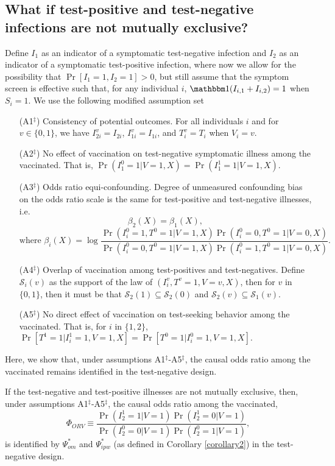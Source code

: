 \begin{appendix}
\subsection{What if test-positive and test-negative infections are not mutually exclusive?}
Define $I_1$ as an indicator of a symptomatic test-negative infection and $I_2$ as an indicator of a symptomatic test-positive infection, where now we allow for the possibility that $\Pr[I_1 = 1, I_2 = 1] > 0$, but still assume that the symptom screen is effective such that, for any individual $i$, $\mathbbm 1(I_{i,1} + I_{i,2}) = 1$ when $S_i = 1$. We use the following modified assumption set 
\begin{itemize}
    \item[(A1$^\ddagger$)] Consistency of potential outcomes. For all individuals $i$ and for $v \in \{0, 1\}$, we have $I_{2i}^v = I_{2i}$, $I_{1i}^v = I_{1i}$, and $T_i^v = T_i$ when $V_i = v$.
    \item[(A2$^\ddagger$)] No effect of vaccination on test-negative symptomatic illness  among the vaccinated. That is, $\Pr(I_1^0 = 1 | V = 1, X) = \Pr(I_1^1 = 1 | V = 1, X).$
    \item[(A3$^\ddagger$)] Odds ratio equi-confounding. Degree of unmeasured confounding bias on the odds ratio scale is the same for test-positive and test-negative illnesses, i.e. 
        $$\beta_2(X) = \beta_1(X), $$
        $$ \text{where } \beta_i(X) = \log \frac{\Pr(I^0_i = 1, T^0 = 1 | V = 1, X)\Pr(I^0_i = 0, T^0 = 1 | V = 0, X)}{\Pr(I^0_i = 0, T^0 = 1 | V = 1, X)\Pr(I^0_i = 1, T^0 = 1| V = 0, X)}.$$
    \item[(A4$^\ddagger$)] Overlap of vaccination among test-positives and test-negatives. Define $\mathcal{S}_i(v)$ as the support of the law of $(I^v_i, T^v = 1, V = v, X)$, then for $v$ in $\{0,1\}$, then it must be that $\mathcal{S}_2(1) \subseteq \mathcal{S}_2(0)$ and $\mathcal{S}_2(v) \subseteq \mathcal{S}_1(v).$
    \item[(A5$^\ddagger$)] No direct effect of vaccination on test-seeking behavior among the vaccinated. That is, for $i$ in $\{1,2\}$, $\Pr[T^1 = 1 | I^1_i = 1, V = 1, X] = \Pr[T^0 = 1 | I^0_i = 1, V = 1, X].$
\end{itemize}
Here, we show that, under assumptions A1$^\ddagger$-A5$^\ddagger$, the causal odds ratio among the vaccinated remains identified in the test-negative design.

\begin{theorem}
    If the test-negative and test-positive illnesses are not mutually exclusive, then, under assumptions A1$^\ddagger$-A5$^\ddagger$, the causal odds ratio among the vaccinated, 
    \begin{equation*}
        \Phi_{ORV} \equiv \dfrac{\Pr(I^1_2=1|V=1)\Pr(I^1_2=0|V=1)}{\Pr(I^0_2=0|V=1)\Pr(I^0_2=1|V=1)},
    \end{equation*}
    is identified by $\Psi^*_{om}$ and $\Psi^*_{ipw}$ (as defined in Corollary \ref{corollary2}) in the test-negative design.
    \end{theorem}
    

\end{appendix}
